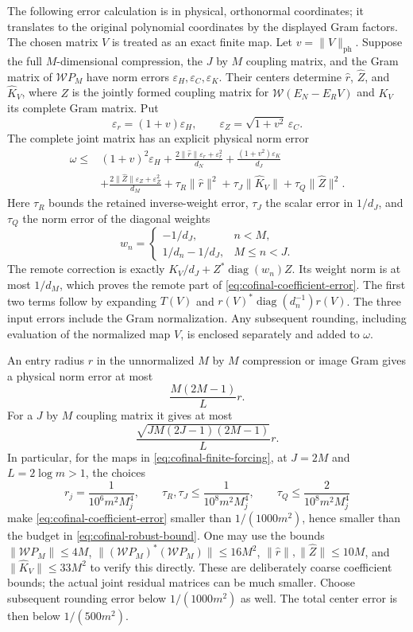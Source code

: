The following error calculation is in physical, orthonormal
coordinates; it translates to the original polynomial coordinates
by the displayed Gram factors. The chosen matrix $V$ is treated as
an exact finite map. Let $v=\|V\|_{\mathrm{ph}}$.
Suppose the full $M$-dimensional compression, the $J$ by $M$
coupling matrix, and the Gram matrix of $\mathcal WP_M$ have
norm errors $\varepsilon_H,\varepsilon_C,\varepsilon_K$.
Their centers determine $\widehat r$, $\widehat Z$, and
$\widehat K_V$, where $Z$ is the jointly formed coupling matrix
for $\mathcal W(E_N-E_RV)$ and $K_V$ its complete Gram matrix.
Put
\[
 \varepsilon_r=(1+v)\varepsilon_H,\qquad
 \varepsilon_Z=\sqrt{1+v^2}\,\varepsilon_C.
\]
The complete joint matrix has an explicit physical norm error
\begin{align}
 \omega\le{}&(1+v)^2\varepsilon_H
 +\frac{2\|\widehat r\|\varepsilon_r+\varepsilon_r^2}{d_N}
 +\frac{(1+v^2)\varepsilon_K}{d_J}\\
 &+\frac{2\|\widehat Z\|\varepsilon_Z+\varepsilon_Z^2}{d_M}
 +\tau_R\|\widehat r\|^2
 +\tau_J\|\widehat K_V\|
 +\tau_Q\|\widehat Z\|^2.
 \label{eq:cofinal-coefficient-error}
\end{align}
Here $\tau_R$ bounds the retained inverse-weight error,
$\tau_J$ the scalar error in $1/d_J$, and $\tau_Q$ the norm
error of the diagonal weights
\[
 w_n=\begin{cases}
 -1/d_J,&n<M,\\
 1/d_n-1/d_J,&M\le n<J.
 \end{cases}
\]
The remote correction is exactly $K_V/d_J+Z^*\operatorname{diag}
(w_n)Z$. Its weight norm is at most $1/d_M$, which proves the
remote part of \eqref{eq:cofinal-coefficient-error}.
The first two terms follow by expanding
$T(V)$ and $r(V)^*\operatorname{diag}(d_n^{-1})r(V)$.
The three input errors include the Gram normalization.  Any
subsequent rounding, including evaluation of the normalized map $V$,
is enclosed separately and added to $\omega$.

An entry radius $r$ in the unnormalized $M$ by $M$ compression
or image Gram gives a physical norm error at most
\[
 \frac{M(2M-1)}{L}r.
\]
For a $J$ by $M$ coupling matrix it gives at most
\[
 \frac{\sqrt{JM(2J-1)(2M-1)}}{L}r.
\]
In particular, for the maps in
\eqref{eq:cofinal-finite-forcing}, at $J=2M$ and
$L=2\log m>1$, the choices
\[
 r_j=\frac1{10^6m^2M_j^4},\qquad
 \tau_R,\tau_J\le\frac1{10^8m^2M_j^4},\qquad
 \tau_Q\le\frac2{10^8m^2M_j^4}
\]
make \eqref{eq:cofinal-coefficient-error} smaller than
$1/(1000m^2)$, hence smaller than the budget in
\eqref{eq:cofinal-robust-bound}.
One may use the bounds
$\|\mathcal WP_M\|\le4M$,
$\|(\mathcal WP_M)^*(\mathcal WP_M)\|\le16M^2$,
$\|\widehat r\|,\|\widehat Z\|\le10M$, and
$\|\widehat K_V\|\le33M^2$ to verify this directly.
These are deliberately coarse coefficient bounds; the actual
joint residual matrices can be much smaller.  Choose subsequent
rounding error below $1/(1000m^2)$ as well.  The total center
error is then below $1/(500m^2)$.

